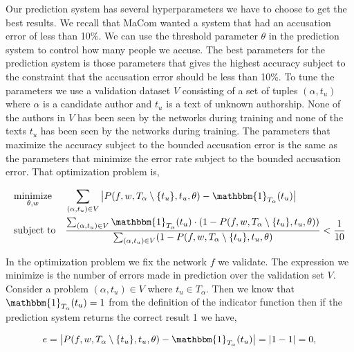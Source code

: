 Our prediction system has several hyperparameters we have to choose to get
the best results. We recall that MaCom wanted a system that had an accusation
error of less than 10\%. We can use the threshold parameter $\theta$ in the
prediction system to control how many people we accuse. The best parameters
for the prediction system is those parameters that gives the highest accuracy
subject to the constraint that the accusation error should be less than 10\%.
To tune the parameters we use a validation dataset $V$ consisting of a set of
tuples $(\alpha, t_u)$ where $\alpha$ is a candidate author and $t_u$ is a text
of unknown authorship. None of the authors in $V$ has been seen by the networks
during training and none of the texts $t_u$ has been seen by the networks during
training. The parameters that maximize the accuracy subject to the bounded
accusation error is the same as the parameters that minimize the error rate
subject to the bounded accusation error. That optimization problem is,

\begin{equation}
    \label{eq:prediction_system_minimization}
    \begin{aligned}
        & \underset{\theta, w}{\text{minimize}}
        & & \sum_{(\alpha, t_u) \in V} \left|
            P(f, w, T_\alpha \setminus \{t_u\}, t_u, \theta) -
            \mathbbm{1}_{T_\alpha}(t_u)
        \right| \\
        & \text{subject to}
        & & \frac{\sum_{(\alpha, t_u) \in V} \mathbbm{1}_{T_\alpha}(t_u) \cdot
            \left(1 - P(f, w, T_\alpha \setminus \{t_u\}, t_u, \theta)\right)}
{\sum_{(\alpha, t_u) \in V} (1 - P(f, w, T_\alpha \setminus \{t_u\}, t_u, \theta)} <
            \frac{1}{10} 
    \end{aligned}
\end{equation}

In the optimization problem we fix the network $f$ we validate. The expression
we minimize is the number of errors made in prediction over the validation set
$V$. Consider a problem $(\alpha, t_u) \in V$ where $t_u \in T_\alpha$. Then we
know that $\mathbbm{1}_{T_\alpha}(t_u) = 1$ from the definition of the indicator
function then if the prediction system returns the correct result 1 we have,

\begin{equation}
    e = \left|
        P(f, w, T_\alpha \setminus \{t_u\}, t_u, \theta) -
        \mathbbm{1}_{T_\alpha}(t_u)
    \right| = |1 - 1| = 0,
\end{equation}

